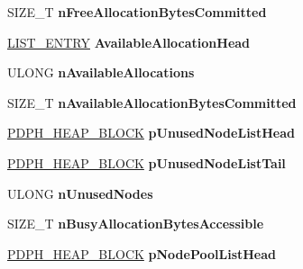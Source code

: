 \begin{DoxyCompactItemize}
S\+I\+Z\+E\+\_\+T {\bfseries n\+Free\+Allocation\+Bytes\+Committed}
\item 
\mbox{\label{struct___d_p_h___h_e_a_p___r_o_o_t_a5e3be1a1128ec27c76f334ac23a16297}} 
\hyperlink{struct___l_i_s_t___e_n_t_r_y}{L\+I\+S\+T\+\_\+\+E\+N\+T\+RY} {\bfseries Available\+Allocation\+Head}
\item 
\mbox{\label{struct___d_p_h___h_e_a_p___r_o_o_t_afb3fc2831b8516fab5c1f4d1b1da874c}} 
U\+L\+O\+NG {\bfseries n\+Available\+Allocations}
\item 
\mbox{\label{struct___d_p_h___h_e_a_p___r_o_o_t_a8fbf1973ba7cf21ef0cbd1c28005b8c0}} 
S\+I\+Z\+E\+\_\+T {\bfseries n\+Available\+Allocation\+Bytes\+Committed}
\item 
\mbox{\label{struct___d_p_h___h_e_a_p___r_o_o_t_ad614e4a62c4e21c9e1a10c43f3382fff}} 
\hyperlink{struct___d_p_h___h_e_a_p___b_l_o_c_k}{P\+D\+P\+H\+\_\+\+H\+E\+A\+P\+\_\+\+B\+L\+O\+CK} {\bfseries p\+Unused\+Node\+List\+Head}
\item 
\mbox{\label{struct___d_p_h___h_e_a_p___r_o_o_t_ae6142a4b1fd18934e44013b8734f3b41}} 
\hyperlink{struct___d_p_h___h_e_a_p___b_l_o_c_k}{P\+D\+P\+H\+\_\+\+H\+E\+A\+P\+\_\+\+B\+L\+O\+CK} {\bfseries p\+Unused\+Node\+List\+Tail}
\item 
\mbox{\label{struct___d_p_h___h_e_a_p___r_o_o_t_a238d4d0d3ab2daf967f4624953df0571}} 
U\+L\+O\+NG {\bfseries n\+Unused\+Nodes}
\item 
\mbox{\label{struct___d_p_h___h_e_a_p___r_o_o_t_adbe502a68e63a209c10f42583ff246d2}} 
S\+I\+Z\+E\+\_\+T {\bfseries n\+Busy\+Allocation\+Bytes\+Accessible}
\item 
\mbox{\label{struct___d_p_h___h_e_a_p___r_o_o_t_a439a512f63035e0dbb55011bd4a4e4ed}} 
\hyperlink{struct___d_p_h___h_e_a_p___b_l_o_c_k}{P\+D\+P\+H\+\_\+\+H\+E\+A\+P\+\_\+\+B\+L\+O\+CK} {\bfseries p\+Node\+Pool\+List\+Head}
\item 
\mbox{\label{struct___d_p_h___h_e_a_p___r_o_o_t_a085879ccb02f79f8bb2e0704df84a6a6}} 

\end{DoxyCompactItemize}
